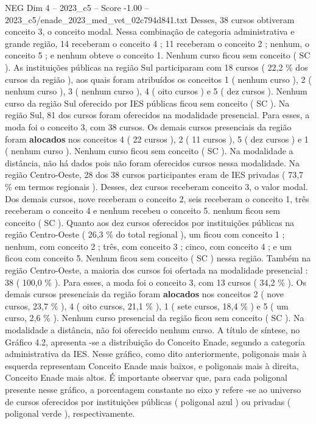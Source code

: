 \begin{textsample}{NEG Dim 4 – 2023\_c5 – Score -1.00 – 2023\_c5/enade\_2023\_med\_vet\_02c794d841.txt}
Desses, 38 cursos obtiveram conceito 3, o conceito modal.
Nessa combinação de categoria administrativa e grande região, 14 receberam o conceito 4 ; 11 receberam o conceito 2 ; nenhum, o conceito 5 ; e nenhum obteve o conceito 1.
Nenhum curso ficou sem conceito ( SC ).
As instituições públicas na região Sul participaram com 18 cursos ( 22,2 \% dos cursos da região ), aos quais foram atribuídos os conceitos 1 ( nenhum curso ), 2 ( nenhum curso ), 3 ( nenhum curso ), 4 ( oito cursos ) e 5 ( dez cursos ).
Nenhum curso da região Sul oferecido por IES públicas ficou sem conceito ( SC ).
Na região Sul, 81 dos cursos foram oferecidos na modalidade presencial.
Para esses, a moda foi o conceito 3, com 38 cursos.
Os demais cursos presenciais da região foram \textbf{alocados} nos conceitos 4 ( 22 cursos ), 2 ( 11 cursos ), 5 ( dez cursos ) e 1 ( nenhum curso ).
Nenhum curso ficou sem conceito ( SC ).
Na modalidade a distância, não há dados pois não foram oferecidos cursos nessa modalidade.
Na região Centro-Oeste, 28 dos 38 cursos participantes eram de IES privadas ( 73,7 \% em termos regionais ).
Desses, dez cursos receberam conceito 3, o valor modal.
Dos demais cursos, nove receberam o conceito 2, seis receberam o conceito 1, três receberam o conceito 4 e nenhum recebeu o conceito 5. nenhum ficou sem conceito ( SC ).
Quanto aos dez cursos oferecidos por instituições públicas na região Centro-Oeste ( 26,3 \% do total regional ), um ficou com conceito 1 ; nenhum, com conceito 2 ; três, com conceito 3 ; cinco, com conceito 4 ; e um ficou com conceito 5.
Nenhum ficou sem conceito ( SC ) nessa região.
Também na região Centro-Oeste, a maioria dos cursos foi ofertada na modalidade presencial : 38 ( 100,0 \% ).
Para esses, a moda foi o conceito 3, com 13 cursos ( 34,2 \% ).
Os demais cursos presenciais da região foram \textbf{alocados} nos conceitos 2 ( nove cursos, 23,7 \% ), 4 ( oito cursos, 21,1 \% ), 1 ( sete cursos, 18,4 \% ) e 5 ( um curso, 2,6 \% ).
Nenhum curso presencial da região ficou sem conceito ( SC ).
Na modalidade a distância, não foi oferecido nenhum curso.
A título de síntese, no Gráfico 4.2, apresenta -se a distribuição do Conceito Enade, segundo a categoria administrativa da IES.
Nesse gráfico, como dito anteriormente, poligonais mais à esquerda representam Conceito Enade mais baixos, e poligonais mais à direita, Conceito Enade mais altos.
É importante observar que, para cada poligonal presente nesse gráfico, a porcentagem constante no eixo y refere -se ao universo de cursos oferecidos por instituições públicas ( poligonal azul ) ou privadas ( poligonal verde ), respectivamente.

\end{textsample}
